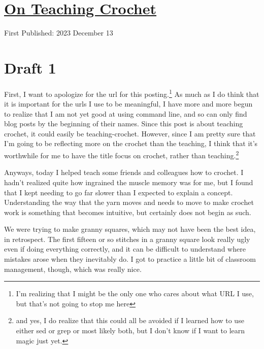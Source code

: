 \documentclass[12pt]{article}[titlepage]
\newcommand{\1}{\={a}}
\newcommand{\2}{\={e}}
\newcommand{\3}{\={\i}}
\newcommand{\4}{\=o}
\newcommand{\5}{\=u}
\newcommand{\6}{\={A}}
\renewcommand{\,}{\textsuperscript{,}}
\begin{document}
\doublespacing
\section{\href{crochet-teaching.html}{On Teaching Crochet}}
First Published: 2023 December 13


\section{Draft 1}
First, I want to apologize for the url for this posting.\footnote{I'm realizing that I might be the only one who cares about what URL I use, but that's not going to stop me here}
As much as I do think that it is important for the urls I use to be meaningful, I have more and more begun to realize that I am not yet good at using command line, and so can only find blog posts by the beginning of their names.
Since this post is about teaching crochet, it could easily be teaching-crochet.
However, since I am pretty sure that I'm going to be reflecting more on the crochet than the teaching, I think that it's worthwhile for me to have the title focus on crochet, rather than teaching.\footnote{and yes, I do realize that this could all be avoided if I learned how to use either sed or grep or most likely both, but I don't know if I want to learn magic just yet.}

Anyways, today I helped teach some friends and colleagues how to crochet.
I hadn't realized quite how ingrained the muscle memory was for me, but I found that I kept needing to go far slower than I expected to explain a concept.
Understanding the way that the yarn moves and needs to move to make crochet work is something that becomes intuitive, but certainly does not begin as such.

We were trying to make granny squares, which may not have been the best idea, in retrospect.
The first fifteen or so stitches in a granny square look really ugly even if doing everything correctly, and it can be difficult to understand where mistakes arose when they inevitably do.
I got to practice a little bit of classroom management, though, which was really nice.
\end{document}
